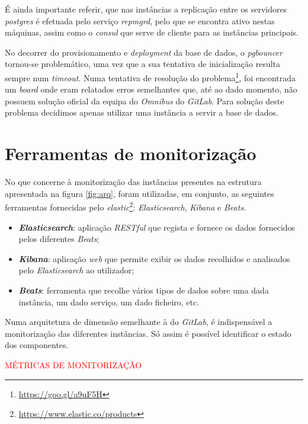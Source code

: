 \documentclass[12pt,a4paper]{article}
\begin{document}
É ainda importante referir, que nas instâncias a replicação entre os servidores \emph{postgres} é efetuada pelo serviço \emph{repmgrd}, pelo que se encontra ativo nestas máquinas, assim como o \emph{consul} que serve de cliente para as instâncias principais.

No decorrer do provisionamento e \emph{deployment} da base de dados, o \emph{pgbouncer} tornou-se problemático, uma vez que a sua tentativa de inicialização resulta sempre num \emph{timeout}. Numa tentativa de resolução do problema\footnote{\url{https://goo.gl/a9uF5H}}, foi encontrada um \emph{board} onde eram relatados erros semelhantes que, até ao dado momento, não possuem solução oficial da equipa do \emph{Omnibus} do \emph{GitLab}. Para solução deste problema decidimos apenas utilizar uma instância a servir a base de dados.


\newpage
\section{Ferramentas de monitorização}

No que concerne à monitorização das instâncias presentes na estrutura apresentada na figura \ref{fig:arq}, foram utilizadas, em conjunto, as seguintes ferramentas fornecidas pelo \emph{elastic}\footnote{\url{https://www.elastic.co/products}}: \emph{Elasticsearch}, \emph{Kibana} e \emph{Beats}.

\begin{itemize}
    \item \textbf{\emph{Elasticsearch}}: aplicação \emph{RESTful} que regista e fornece os dados fornecidos pelos diferentes \emph{Beats};
    \item \textbf{\emph{Kibana}}: aplicação \emph{web} que permite exibir os dados recolhidos e analisados pelo \emph{Elasticsearch} ao utilizador;
    \item \textbf{\emph{Beats}}: ferramenta que recolhe vários tipos de dados sobre uma dada instância, um dado serviço, um dado ficheiro, etc.
\end{itemize}

Numa arquitetura de dimensão semelhante à do \emph{GitLab}, é indispensável a monitorização das diferentes instâncias. Só assim é possível identificar o estado dos componentes.

\textcolor{red}{MÉTRICAS DE MONITORIZAÇÃO}
\end{document}
